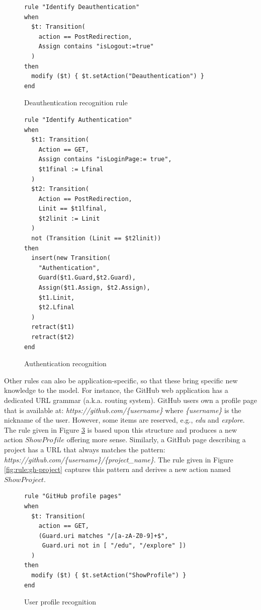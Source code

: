 \begin{figure}[h]
\begin{framed}
\begin{BVerbatim}
rule "Identify Deauthentication"
when
  $t: Transition(
    action == PostRedirection,
    Assign contains "isLogout:=true"
  )
then
  modify ($t) { $t.setAction("Deauthentication") }
end
\end{BVerbatim}
\end{framed}

\caption{Deauthentication recognition rule}
\label{fig:rule:deauth}
\end{figure}


\begin{figure}[h]
\begin{framed}
\begin{BVerbatim}
rule "Identify Authentication"
when
  $t1: Transition(
    Action == GET,
    Assign contains "isLoginPage:= true",
    $t1final := Lfinal
  )
  $t2: Transition(
    Action == PostRedirection,
    Linit == $t1lfinal,
    $t2linit := Linit
  )
  not (Transition (Linit == $t2linit))
then
  insert(new Transition(
    "Authentication",
    Guard($t1.Guard,$t2.Guard),
    Assign($t1.Assign, $t2.Assign),
    $t1.Linit,
    $t2.Lfinal
  )
  retract($t1)
  retract($t2)
end
\end{BVerbatim}
\end{framed}

\caption{Authentication recognition}
\label{fig:rule:auth}
\end{figure}

Other rules can also be application-specific, so that these bring
specific new knowledge to the model. For instance, the GitHub web
application has a dedicated URL grammar (a.k.a. routing system).
GitHub users own a profile page that is available at:
\textit{https://github.com/\{username\}} where \textit{\{username\}}
is the nickname of the user. However, some items are reserved,
e.g., \textit{edu} and \textit{explore}. The rule given in Figure
\ref{fig:rule:gh-profile} is based upon this structure and
produces a new action $ShowProfile$ offering more sense.
Similarly, a GitHub page describing a project has a URL that
always matches the pattern:
\textit{https://github.com/\{username\}/\{project\_name\}}. The
rule given in Figure \ref{fig:rule:gh-project} captures this
pattern and derives a new action named $ShowProject$.

\begin{figure}
\begin{framed}
\begin{BVerbatim}
rule "GitHub profile pages"
when
  $t: Transition(
    action == GET,
    (Guard.uri matches "/[a-zA-Z0-9]+$",
     Guard.uri not in [ "/edu", "/explore" ])
  )
then
  modify ($t) { $t.setAction("ShowProfile") }
end
\end{BVerbatim}
\end{framed}

\caption{User profile recognition}
\label{fig:rule:gh-profile}
\end{figure}

